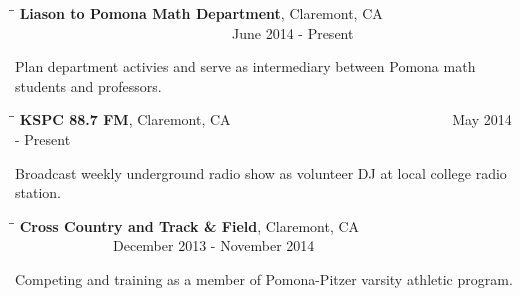 \documentclass{res}
\begin{document}
\begin{resume}
 
 \vspace{0.0in}   
\hspace{2.7in}{\bf EXTRACURRICULAR ACTIVITIES}
 \vspace{-0.2in}	         
\begin{tabbing}%
  
   \hspace{2.3in}\= \hspace{2.6in}\= \kill %
   {\bf Liason to Pomona Math Department}, Claremont, CA \> \>~~~~~~~~~~~~~~~~~~~~~~~~~~~~~~~June 2014 - Present
   \end{tabbing}\vspace{-21pt}
    Plan department activies and serve as intermediary between Pomona math students and professors.
    \vspace{-0.175in}
   \begin{tabbing}%
   \hspace{2.3in}\= \hspace{2.6in}\= \kill %
   {\bf KSPC 88.7 FM}, Claremont, CA \> \>~~~~~~~~~~~~~~~~~~~~~~~~~~~~~~~May 2014 - Present
   \end{tabbing}\vspace{-21pt}
    Broadcast weekly underground radio show as volunteer DJ at local college radio station.
    \vspace{-0.175in} 
   \begin{tabbing}%
    \hspace{2.3in}\= \hspace{2.6in}\= \kill %
   {\bf Cross Country and Track \& Field}, Claremont, CA \> \>~~~~~~~~~~~~~~December 2013 - November 2014
   \end{tabbing}\vspace{-21pt}
   	Competing and training as a member of Pomona-Pitzer varsity athletic program.

        


\end{resume}
\end{document}
